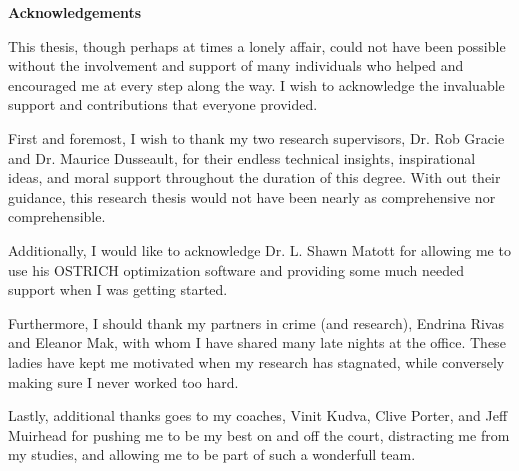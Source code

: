 \cleardoublepage


\begin{center}\textbf{Acknowledgements}\end{center}

This thesis, though perhaps at times a lonely affair, could not have been possible without the involvement and support of many individuals who helped and encouraged me at every step along the way. I wish to acknowledge the invaluable support and contributions that everyone provided. 

First and foremost, I wish to thank my two research supervisors, Dr. Rob Gracie and Dr. Maurice Dusseault, for their endless technical insights, inspirational ideas, and moral support throughout the duration of this degree. With out their guidance, this research thesis would not have been nearly as comprehensive nor comprehensible.

Additionally, I would like to acknowledge Dr. L. Shawn Matott for allowing me to use his OSTRICH optimization software and providing some much needed support when I was getting started. 

Furthermore, I should thank my partners in crime (and research), Endrina Rivas and Eleanor Mak, with whom I have shared many late nights at the office. These ladies have kept me motivated when my research has stagnated, while conversely making sure I never worked too hard. 

Lastly, additional thanks goes to my coaches, Vinit Kudva, Clive Porter, and Jeff Muirhead for pushing me to be my best on and off the court, distracting me from my studies, and allowing me to be part of such a wonderfull team.

\cleardoublepage





\renewcommand\contentsname{Table of Contents}
\tableofcontents
\cleardoublepage
{}

\listoftables
\cleardoublepage
{}		%

